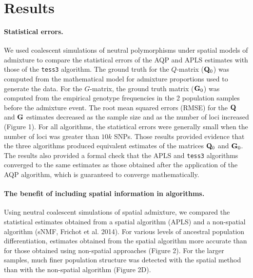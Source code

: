 \clearpage
\newpage


\section{Results}



\paragraph{Statistical errors.}  We used  coalescent simulations of neutral polymorphisms under spatial models of admixture to compare the statistical errors of the AQP and APLS
estimates with those of the {\tt tess3} algorithm. The ground truth for the $Q$-matrix (${\bf Q}_0$)  was computed from the mathematical model for admixture proportions used to generate the data. For the $G$-matrix, the  ground truth matrix (${\bf G}_0$) was computed from the empirical genotype frequencies in the 2 population samples before the admixture event.  The root mean squared errors (RMSE) for the ${\bf Q}$ and ${\bf G}$ estimates decreased as the sample size and as the number of loci increased (Figure 1). For all algorithms, the statistical errors were generally small when the number of loci was greater than $10k$ SNPs. Those results provided evidence that the three algorithms produced equivalent estimates of the matrices ${\bf Q}_0$ and ${\bf G}_0$. The results also provided a formal check that the APLS and {\tt tess3} algorithms converged to the same estimates as those obtained after the application of  the AQP algorithm, which is guaranteed to converge mathematically.   


\paragraph{The benefit of including spatial information in algorithms.}    Using  neutral coalescent simulations of spatial admixture, we compared the statistical estimates obtained from a spatial algorithm (APLS) and a non-spatial algorithm (sNMF, Frichot et al. 2014).  For various levels of ancestral population differentiation, estimates obtained from the spatial algorithm more accurate than for those obtained using non-spatial approaches (Figure 2). For the larger samples, much finer population structure was detected with the spatial method than with the non-spatial algorithm (Figure 2D). 

